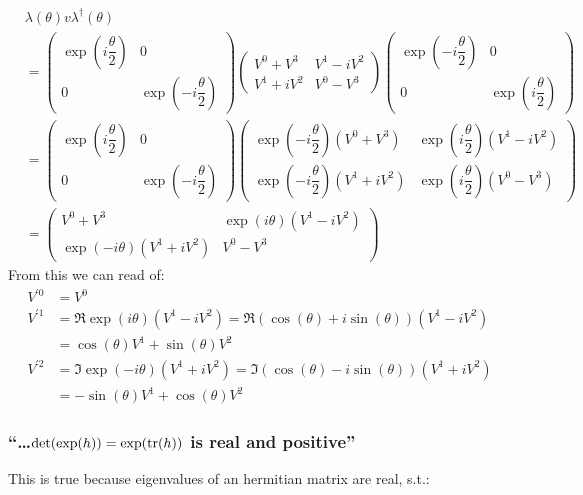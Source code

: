 \begin{widetext}
	\begin{align*}
		&\lambda(\theta) v \lambda^\dagger (\theta)\\
		&=\left(\begin{array}{cc}
			\exp(i\dfrac{\theta}{2})& 0 \\
			0& \exp(-i\dfrac{\theta}{2})
		\end{array}\right)
		\left(\begin{array}{cc}
			V^0+V^3&V^1-iV^2  \\
			V^1+iV^2&V^0-V^3 
		\end{array}\right)
		\left(\begin{array}{cc}
			\exp(-i\dfrac{\theta}{2})& 0 \\
			0& \exp(i\dfrac{\theta}{2})
		\end{array}\right)\\
	&=\left(\begin{array}{cc}
		\exp(i\dfrac{\theta}{2})& 0 \\
		0& \exp(-i\dfrac{\theta}{2})
	\end{array}\right)
	\left(\begin{array}{cc}
		\exp(-i\dfrac{\theta}{2})(V^0+V^3)&\exp(i\dfrac{\theta}{2})(V^1-iV^2)  \\
		\exp(-i\dfrac{\theta}{2})(V^1+iV^2)&\exp(i\dfrac{\theta}{2})(V^0-V^3) 
	\end{array}\right)\\
	&=\left(\begin{array}{cc}
		V^0+V^3&\exp(i{\theta})(V^1-iV^2)  \\
		\exp(-i{\theta})(V^1+iV^2)&V^0-V^3
	\end{array}\right)
	\end{align*}
	From this we can read of:
	\begin{align*}
		V^{\prime 0} &= V^0\\
		V^{\prime 1} &= \Re{\exp(i{\theta})(V^1-iV^2)}=\Re{(\cos(\theta)+i\sin(\theta))(V^1-iV^2)}\\
		&=\cos(\theta)V^1+\sin(\theta)V^2\\
		V^{\prime 2} &= \Im{\exp(-i{\theta})(V^1+iV^2)}=\Im{(\cos(\theta)-i\sin(\theta))(V^1+iV^2)}\\
		&=-\sin(\theta)V^1+\cos(\theta)V^2
	\end{align*}
\end{widetext}

\subsubsection{\enquote{\dots $\det(\exp(h))=\exp(\tr(h))$ is real and positive} }
This is true because eigenvalues of an hermitian matrix are real, s.t.:


